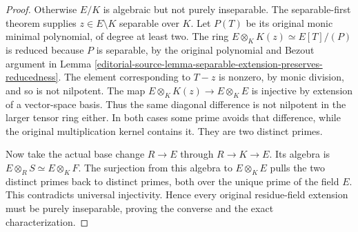 \begin{proof}
Otherwise $E/K$ is algebraic but
not purely inseparable. The
separable-first theorem supplies
$z\in E\setminus K$ separable over
$K$. Let $P(T)$ be its original
monic minimal polynomial, of degree
at least two. The ring
$E\otimes_K K(z)\simeq E[T]/(P)$
is reduced because $P$ is separable,
by the original polynomial and
Bezout argument in Lemma
\ref{editorial-source-lemma-separable-extension-preserves-reducedness}.
The element corresponding to $T-z$
is nonzero, by monic division,
and so is not nilpotent. The map
$E\otimes_K K(z)\to E\otimes_K E$
is injective by extension of a
vector-space basis. Thus the same
diagonal difference is not nilpotent
in the larger tensor ring either.
In both cases some prime avoids
that difference, while the original
multiplication kernel contains it.
They are two distinct primes.

Now take the actual base change
$R\to E$ through $R\to K\to E$.
Its algebra is
$E\otimes_R S\simeq E\otimes_K F$.
The surjection from this algebra
to $E\otimes_K E$ pulls the two
distinct primes back to distinct
primes, both over the unique prime
of the field $E$. This contradicts
universal injectivity. Hence every
original residue-field extension
must be purely inseparable, proving
the converse and the exact
characterization.
\end{proof}